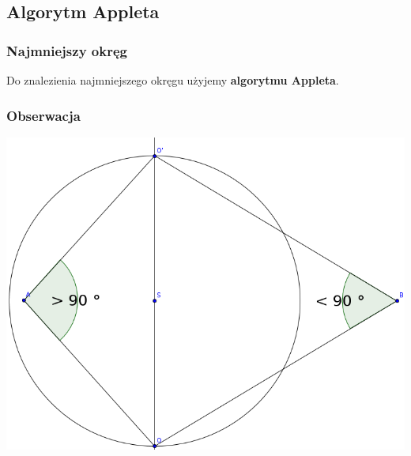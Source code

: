 \documentclass{beamer}
\begin{document}
\subsection{Algorytm Appleta}

\begin{frame}
\frametitle{Najmniejszy okręg}
\begin{center}
Do znalezienia najmniejszego okręgu użyjemy \textbf{algorytmu Appleta}.
\end{center}

\end{frame}


\begin{frame}
\frametitle{Obserwacja}
\begin{center}
\includegraphics[width=0.65\paperwidth]{pics/angles.png}
\end{center}

\end{frame}

\end{document}

